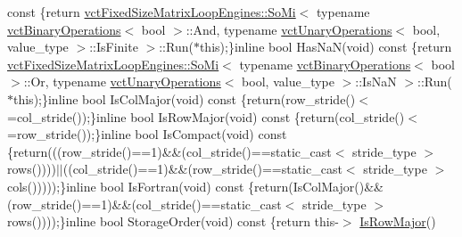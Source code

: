 \begin{DoxyCompactItemize}
const \{return \hyperlink{classvct_fixed_size_matrix_loop_engines_1_1_so_mi}{vct\+Fixed\+Size\+Matrix\+Loop\+Engines\+::\+So\+Mi}$<$ typename \hyperlink{classvct_binary_operations}{vct\+Binary\+Operations}$<$ bool $>$\+::And, typename \hyperlink{classvct_unary_operations}{vct\+Unary\+Operations}$<$ bool, value\+\_\+type $>$\+::Is\+Finite $>$\+::Run($\ast$this);\}inline bool Has\+Na\+N(void) const \{return \hyperlink{classvct_fixed_size_matrix_loop_engines_1_1_so_mi}{vct\+Fixed\+Size\+Matrix\+Loop\+Engines\+::\+So\+Mi}$<$ typename \hyperlink{classvct_binary_operations}{vct\+Binary\+Operations}$<$ bool $>$\+::Or, typename \hyperlink{classvct_unary_operations}{vct\+Unary\+Operations}$<$ bool, value\+\_\+type $>$\+::Is\+Na\+N $>$\+::Run($\ast$this);\}inline bool Is\+Col\+Major(void) const \{return(row\+\_\+stride()$<$=col\+\_\+stride());\}inline bool Is\+Row\+Major(void) const \{return(col\+\_\+stride()$<$=row\+\_\+stride());\}inline bool Is\+Compact(void) const \{return(((row\+\_\+stride()==1)\&\&(col\+\_\+stride()==static\+\_\+cast$<$ stride\+\_\+type $>$rows())))$\vert$$\vert$((col\+\_\+stride()==1)\&\&(row\+\_\+stride()==static\+\_\+cast$<$ stride\+\_\+type $>$cols()))));\}inline bool Is\+Fortran(void) const \{return(Is\+Col\+Major()\&\&(row\+\_\+stride()==1)\&\&(col\+\_\+stride()==static\+\_\+cast$<$ stride\+\_\+type $>$rows())));\}inline bool Storage\+Order(void) const \{return this-\/$>$ \hyperlink{classvct_fixed_size_const_matrix_base_a730b5af5396b0eb074e8465e7db81a5f}{Is\+Row\+Major}()
\end{DoxyCompactItemize}

